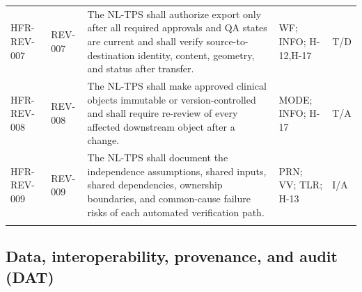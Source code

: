 \documentclass[11pt,letterpaper]{article}
\begin{document}
\begin{scriptsize}
\begin{longtable}{@{}L{0.14\textwidth}L{0.09\textwidth}L{0.47\textwidth}L{0.15\textwidth}L{0.07\textwidth}@{}}
\addlinespace[2pt]
\mbox{HFR-REV-007} & \mbox{REV-007} & The NL-TPS shall authorize export only after all required approvals and QA states are current and shall verify source-to-destination identity, content, geometry, and status after transfer. & WF; INFO; H-12,H-17 & T\slash\allowbreak{}D \\
\addlinespace[2pt]
\mbox{HFR-REV-008} & \mbox{REV-008} & The NL-TPS shall make approved clinical objects immutable or version-controlled and shall require re-review of every affected downstream object after a change. & MODE; INFO; H-17 & T\slash\allowbreak{}A \\
\addlinespace[2pt]
\mbox{HFR-REV-009} & \mbox{REV-009} & The NL-TPS shall document the independence assumptions, shared inputs, shared dependencies, ownership boundaries, and common-cause failure risks of each automated verification path. & PRN; VV; TLR; H-13 & I\slash\allowbreak{}A \\
\addlinespace[2pt]
\end{longtable}
\end{scriptsize}

\subsection{Data, interoperability, provenance, and audit (DAT)}
\end{document}
